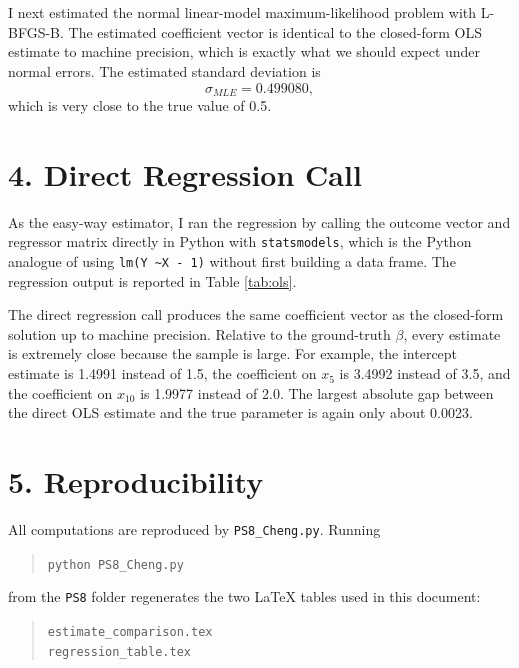 \documentclass[11pt]{article}
\begin{document}
I next estimated the normal linear-model maximum-likelihood problem with L-BFGS-B.
The estimated coefficient vector is identical to the closed-form OLS estimate to machine precision, which is exactly what we should expect under normal errors.
The estimated standard deviation is
\[
\hat{\sigma}_{MLE} = 0.499080,
\]
which is very close to the true value of 0.5.



\section*{4. Direct Regression Call}
As the easy-way estimator, I ran the regression by calling the outcome vector and regressor matrix directly in Python with \texttt{statsmodels}, which is the Python analogue of using \texttt{lm(Y \textasciitilde X - 1)} without first building a data frame.
The regression output is reported in Table \ref{tab:ols}.



The direct regression call produces the same coefficient vector as the closed-form solution up to machine precision.
Relative to the ground-truth \(\beta\), every estimate is extremely close because the sample is large.
For example, the intercept estimate is 1.4991 instead of 1.5, the coefficient on \(x_5\) is 3.4992 instead of 3.5, and the coefficient on \(x_{10}\) is 1.9977 instead of 2.0.
The largest absolute gap between the direct OLS estimate and the true parameter is again only about 0.0023.

\section*{5. Reproducibility}
All computations are reproduced by \texttt{PS8\_Cheng.py}.
Running
\begin{quote}
\texttt{python PS8\_Cheng.py}
\end{quote}
from the \texttt{PS8} folder regenerates the two LaTeX tables used in this document:
\begin{quote}
\texttt{estimate\_comparison.tex}\\
\texttt{regression\_table.tex}
\end{quote}
\end{document}
